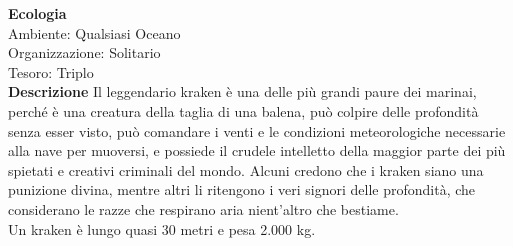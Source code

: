 \begin{multicols}{2}
\textbf{Ecologia}\\
Ambiente: Qualsiasi Oceano\\
Organizzazione: Solitario\\
Tesoro: Triplo\\

\textbf{Descrizione}
Il leggendario kraken è una delle più grandi paure dei marinai, perché è una creatura della taglia di una balena, può colpire delle profondità senza esser visto, può comandare i venti e le condizioni meteorologiche necessarie alla nave per muoversi, e possiede il crudele intelletto della maggior parte dei più spietati e creativi criminali del mondo. Alcuni credono che i kraken siano una punizione divina, mentre altri li ritengono i veri signori delle profondità, che considerano le razze che respirano aria nient’altro che bestiame.\\

Un kraken è lungo quasi 30 metri e pesa 2.000 kg.\\



\end{multicols}
